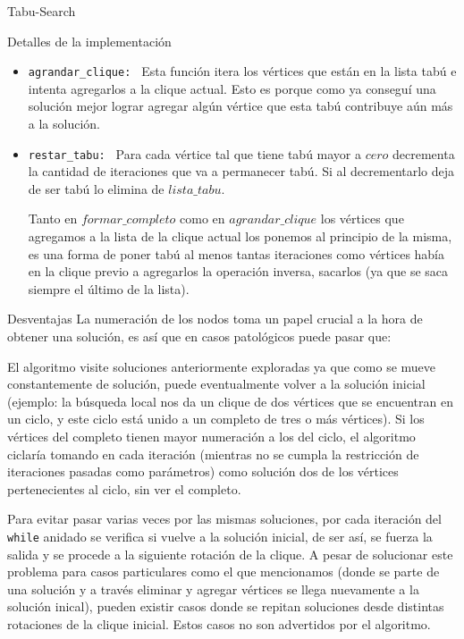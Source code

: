 \begin{section}{Tabu-Search}
\begin{subsection}{Detalles de la implementación}
\begin{itemize}
\begin{itemize}
				\item Si el algoritmo vuelve a la solución inicial y todavía le restan iteraciones del \texttt{while} anidado, queremos evitar que repita exactamente el mismo procedimiento pasando nuevamente por soluciones ya visitadas por lo que forzamos la salida y aplicamos una rotación a dicha solución para explorar nuevas posibilidades.
			\end{itemize}

			\item \texttt{agrandar\_clique: } Esta función itera los vértices que están en la lista tabú e intenta agregarlos a la clique actual. Esto es porque como ya conseguí una solución mejor lograr agregar algún vértice que esta tabú contribuye aún más a la solución.

			\item \texttt{restar\_tabu: } Para cada vértice tal que tiene tabú mayor a $cero$ decrementa la cantidad de iteraciones que va a permanecer tabú. Si al decrementarlo deja de ser tabú lo elimina de $lista\_tabu$.

			Tanto en $formar\_completo$ como en $agrandar\_clique$ los vértices que agregamos a la lista de la clique actual los ponemos al principio de la misma, es una forma de poner tabú al menos tantas iteraciones como vértices había en la clique previo a agregarlos la operación inversa, sacarlos (ya que se saca siempre el último de la lista).
		\end{itemize}
	\end{subsection}

	\begin{subsection}{Desventajas}
		La numeración de los nodos toma un papel crucial a la hora de obtener una solución, es así que en casos patológicos puede pasar que:

		El algoritmo visite soluciones anteriormente exploradas ya que como se mueve constantemente de solución, puede eventualmente volver a la solución inicial (ejemplo: la búsqueda local nos da un clique de dos vértices que se encuentran en un ciclo, y este ciclo está unido a un completo de tres o más vértices). Si los vértices del completo tienen mayor numeración a los del ciclo, el algoritmo ciclaría tomando en cada iteración (mientras no se cumpla la restricción de iteraciones pasadas como parámetros) como solución dos de los vértices pertenecientes al ciclo, sin ver el completo.

		Para evitar pasar varias veces por las mismas soluciones, por cada iteración del \texttt{while} anidado se verifica si vuelve a la solución inicial, de ser así, se fuerza la salida y se procede a la siguiente rotación de la clique.
		A pesar de solucionar este problema para casos particulares como el que mencionamos (donde se parte de una solución y a través eliminar y agregar vértices se llega nuevamente a la solución inical), pueden existir casos donde se repitan soluciones desde distintas rotaciones de la clique inicial. Estos casos no son advertidos por el algoritmo.


\end{subsection}
\end{section}
